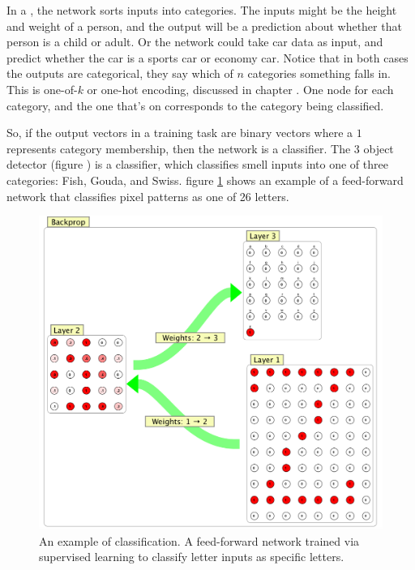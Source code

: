 In a , the network sorts inputs into categories. The inputs might be the height and weight of a person, and the output will be a prediction about whether that person is a child or adult. Or the network could take car data as input, and predict whether the car is a sports car or economy car. Notice that in both cases the outputs are categorical, they say which of $n$ categories something falls in. This is one-of-$k$ or one-hot encoding, discussed in chapter . One node for each category, and the one that's on corresponds to the category being classified. 

So, if the output vectors in a training task are binary vectors where a  $1$ represents category membership, then the network is a classifier. The 3 object detector (figure ) is a classifier, which classifies smell inputs into one of three categories: Fish, Gouda, and Swiss. figure \ref{F:letter_classify} shows an example of a feed-forward network that classifies pixel patterns as one of 26 letters.
  
\begin{figure}[h]
\centering
\includegraphics[scale=.4]{./images/letterClassification.png}
\caption[Simbrain screenshot.]{An example of classification. A feed-forward network trained via supervised learning to classify letter inputs as specific letters.}
\label{F:letter_classify}
\end{figure}

